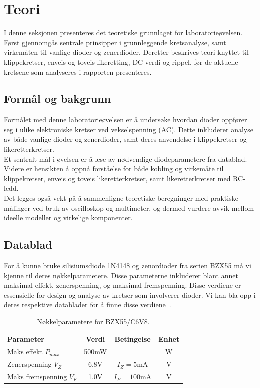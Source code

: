 \section{Teori}

I denne seksjonen presenteres det teoretiske grunnlaget for laboratorieøvelsen. Først gjennomgås sentrale prinsipper i grunnleggende kretsanalyse, samt virkemåten til vanlige dioder og zenerdioder. Deretter beskrives teori knyttet til klippekretser, enveis og toveis likeretting, DC-verdi og rippel, før de aktuelle kretsene som analyseres i rapporten presenteres.

\subsection{Formål og bakgrunn}

Formålet med denne laboratorieøvelsen er å undersøke hvordan dioder oppfører seg i ulike elektroniske kretser ved vekselspenning (AC). Dette inkluderer analyse av både vanlige dioder og zenerdioder, samt deres anvendelse i klippekretser og likeretterkretser.
\\[1em]
Et sentralt mål i øvelsen er å lese av nødvendige diodeparametere fra datablad. Videre er hensikten å oppnå forståelse for både kobling og virkemåte til klippekretser, enveis og toveis likeretterkretser, samt likeretterkretser med RC-ledd.
\\[1em]
Det legges også vekt på å sammenligne teoretiske beregninger med praktiske målinger ved bruk av oscilloskop og multimeter, og dermed vurdere avvik mellom ideelle modeller og virkelige komponenter.

\subsection{Datablad}
For å kunne bruke silisiumsdiode 1N4148 og zenordioder fra serien BZX55 må vi kjenne til deres nøkkelparametere. Disse parameterne inkluderer blant annet maksimal effekt, zenerspenning, og maksimal fremspenning. Disse verdiene er essensielle for design og analyse av kretser som involverer dioder. Vi kan bla opp i deres respektive datablader for å finne disse verdiene~\cite{datasheetBZX55,datasheet1N4148}.

\begin{table}[H]
\centering
\caption{Nøkkelparametere for BZX55/C6V8.}
\label{tab:diode_params}
\begin{tabular}{lccc}
\toprule
\textbf{Parameter} & \textbf{Verdi} & \textbf{Betingelse} & \textbf{Enhet} \\
\midrule

Maks effekt $P_{max}$ & 500mW &  & W \\

Zenerspenning $V_Z$ & 6.8V & $I_Z = 5\text{mA}$ & V \\

Maks fremspenning $V_F$ & 1.0V & $I_F = 100\text{mA}$ & V \\

\bottomrule
\end{tabular}
\end{table}


